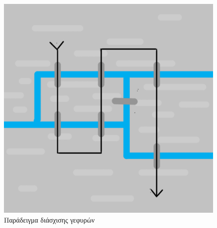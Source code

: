 \begin{figure}[ht]
\begin{minipage}[c]{.46\linewidth}
        \includegraphics[scale=0.15]{2947_thesis/pictures/konigsbergEx.png} 
        \caption{Παράδειγμα διάσχισης γεφυρών}
        \label{2}
    \end{minipage}
\end{figure}

